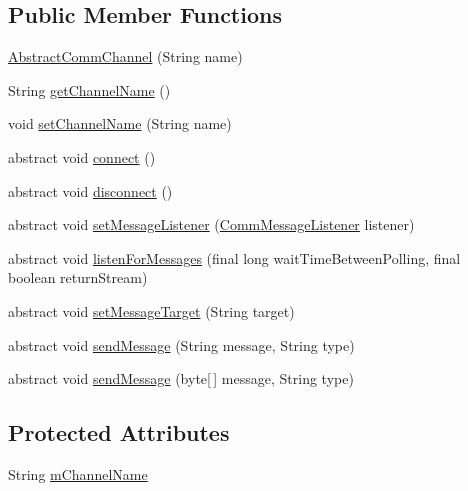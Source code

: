 \subsection*{Public Member Functions}
\begin{DoxyCompactItemize}
\item 
\hyperlink{classcom_1_1cellbots_1_1communication_1_1_abstract_comm_channel_a0b9b7b5c314ea0f7bcbdb24a9a8635b3}{Abstract\-Comm\-Channel} (String name)
\item 
String \hyperlink{classcom_1_1cellbots_1_1communication_1_1_abstract_comm_channel_a16264a499b54e1201d4b7e6289d8cbda}{get\-Channel\-Name} ()
\item 
void \hyperlink{classcom_1_1cellbots_1_1communication_1_1_abstract_comm_channel_a2d4aea4af6df5888ea9008528a8a2c5f}{set\-Channel\-Name} (String name)
\item 
abstract void \hyperlink{classcom_1_1cellbots_1_1communication_1_1_abstract_comm_channel_a0399b82cc9b23187ac3bb76b9e243cbc}{connect} ()
\item 
abstract void \hyperlink{classcom_1_1cellbots_1_1communication_1_1_abstract_comm_channel_a0e03426e4f1911a45c8884164e681812}{disconnect} ()
\item 
abstract void \hyperlink{classcom_1_1cellbots_1_1communication_1_1_abstract_comm_channel_a57f9ddf86cc85b426edee6529a50571d}{set\-Message\-Listener} (\hyperlink{interfacecom_1_1cellbots_1_1communication_1_1_abstract_comm_channel_1_1_comm_message_listener}{Comm\-Message\-Listener} listener)
\item 
abstract void \hyperlink{classcom_1_1cellbots_1_1communication_1_1_abstract_comm_channel_af81ddc53351605f74470567469cfb083}{listen\-For\-Messages} (final long wait\-Time\-Between\-Polling, final boolean return\-Stream)
\item 
abstract void \hyperlink{classcom_1_1cellbots_1_1communication_1_1_abstract_comm_channel_a8a067cf00a2435c21ea5989af0d94905}{set\-Message\-Target} (String target)
\item 
abstract void \hyperlink{classcom_1_1cellbots_1_1communication_1_1_abstract_comm_channel_a7254de3c070de4757a72fb35f352073d}{send\-Message} (String message, String type)
\item 
abstract void \hyperlink{classcom_1_1cellbots_1_1communication_1_1_abstract_comm_channel_ac6eab4aba4a03b187eeadbdde7fc1e96}{send\-Message} (byte\mbox{[}$\,$\mbox{]} message, String type)
\end{DoxyCompactItemize}
\subsection*{Protected Attributes}
\begin{DoxyCompactItemize}
\item 
String \hyperlink{classcom_1_1cellbots_1_1communication_1_1_abstract_comm_channel_a1a5582c77143a40d8afde5490fc1f8b3}{m\-Channel\-Name}
\end{DoxyCompactItemize}


